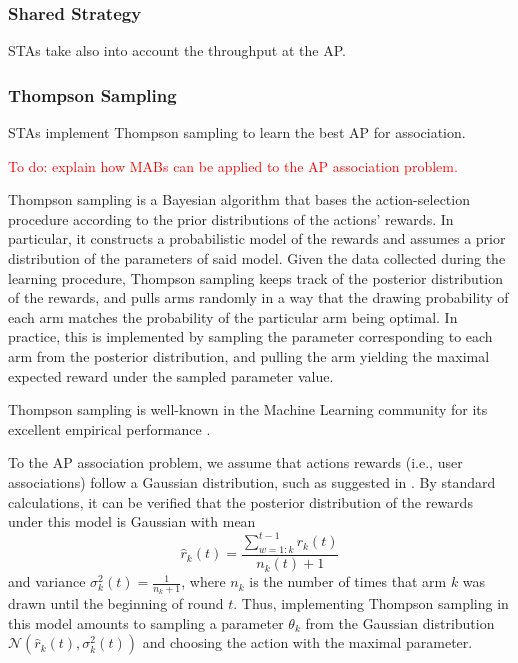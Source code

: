 \documentclass{article}
\begin{document}
		\subsubsection{Shared Strategy}
		\label{section:shared}
			STAs take also into account the throughput at the AP.
	
		\subsubsection{Thompson Sampling}
		\label{section:thompson}
			STAs implement Thompson sampling to learn the best AP for association. 
			
			\textcolor{red}{To do: explain how MABs can be applied to the AP association problem.}	
			
			Thompson sampling \cite{thompson1933likelihood} is a Bayesian algorithm that bases the action-selection procedure according to the prior distributions of the actions' rewards. In particular, it constructs a probabilistic model of the rewards and assumes a prior distribution of the parameters of said model. Given the data collected during the learning procedure, Thompson sampling keeps track of the posterior distribution of the rewards, and pulls arms randomly in a way that the drawing probability of each arm matches the probability of the particular arm being optimal. In practice, this is implemented by sampling the parameter corresponding to each arm from the posterior distribution, and pulling the arm yielding the maximal expected reward under the sampled parameter value.
					
			Thompson sampling is well-known in the Machine Learning community for its excellent empirical performance \cite{CL11}. 
			 
			To the AP association problem, we assume that actions rewards (i.e., user associations) follow a Gaussian distribution, such as suggested in \cite{agrawal2013further}. By standard calculations, it can be verified that the posterior distribution of the rewards under this model is Gaussian with mean 
			\begin{equation}
				\hat{r}_k(t) = \frac{\sum_{w=1:k}^{t-1} r_k(t) }{n_k(t) + 1}
				\nonumber
			\end{equation}
			and variance $\sigma_k^2(t) = \frac{1}{n_k + 1}$, where $n_k$ is the number of times that arm $k$ was drawn until the beginning of round $t$. Thus, implementing Thompson sampling in this model amounts to sampling a parameter $\theta_k$ from the Gaussian distribution $\mathcal{N}\left(\hat{r}_k(t),\sigma_k^2(t)\right)$ and choosing the action with the maximal parameter.   
			
\end{document}
